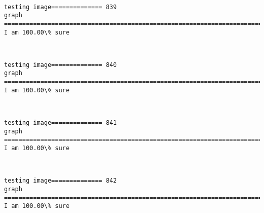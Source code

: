 \documentclass[11pt]{article}
\begin{document}
    \begin{center}
    \end{center}
    { \hspace*{\fill} \\}
    
    \begin{Verbatim}[commandchars=\\\{\}]
testing image============== 839
graph
============================================================================
I am 100.00\% sure

    \end{Verbatim}

    \begin{center}
    \end{center}
    { \hspace*{\fill} \\}
    
    \begin{Verbatim}[commandchars=\\\{\}]
testing image============== 840
graph
============================================================================
I am 100.00\% sure

    \end{Verbatim}

    \begin{center}
    \end{center}
    { \hspace*{\fill} \\}
    
    \begin{Verbatim}[commandchars=\\\{\}]
testing image============== 841
graph
============================================================================
I am 100.00\% sure

    \end{Verbatim}

    \begin{center}
    \end{center}
    { \hspace*{\fill} \\}
    
    \begin{Verbatim}[commandchars=\\\{\}]
testing image============== 842
graph
============================================================================
I am 100.00\% sure

    \end{Verbatim}
\end{document}
